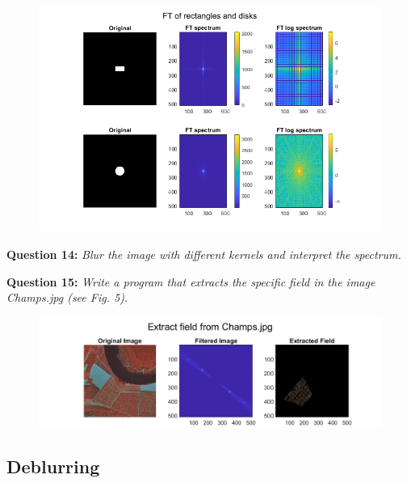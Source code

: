 \begin{figure}[H]
    \centering
    \includegraphics[width=\linewidth]{Doc/Graphics/Part1/Part1_Question13a.png}
\end{figure}




\textbf{Question 14:}
\textit{Blur the image with diﬀerent kernels and interpret the spectrum.}



\textbf{Question 15:}
\textit{Write a program that extracts the speciﬁc ﬁeld in the image Champs.jpg (see Fig. 5).}


\begin{figure}[H]
    \centering
    \includegraphics[width=\linewidth]{Doc/Graphics/Part1/Part1_Question15.png}
    \label{fig:enter-label}
\end{figure}


\subsection{Deblurring}
